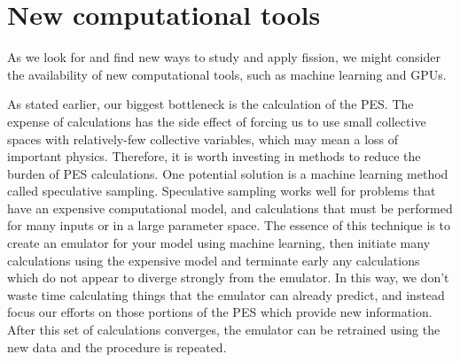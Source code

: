 



\section{New computational tools}
As we look for and find new ways to study and apply fission, we might consider the availability of new computational tools, such as machine learning and GPUs.

As stated earlier, our biggest bottleneck is the calculation of the PES. The expense of calculations has the side effect of forcing us to use small collective spaces with relatively-few collective variables, which may mean a loss of important physics. Therefore, it is worth investing in methods to reduce the burden of PES calculations. One potential solution is a machine learning method called speculative sampling. Speculative sampling works well for problems that have an expensive computational model, and calculations that must be performed for many inputs or in a large parameter space. The essence of this technique is to create an emulator for your model using machine learning, then initiate many calculations using the expensive model and terminate early any calculations which do not appear to diverge strongly from the emulator. In this way, we don't waste time calculating things that the emulator can already predict, and instead focus our efforts on those portions of the PES which provide new information. After this set of calculations converges, the emulator can be retrained using the new data and the procedure is repeated.

